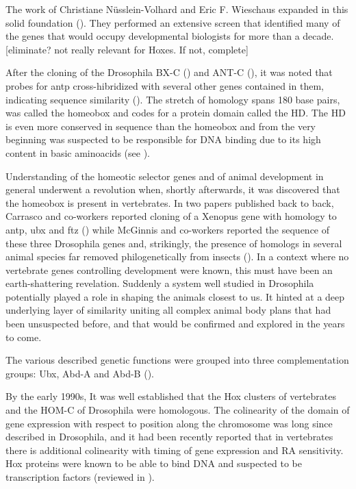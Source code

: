 The work of Christiane Nüsslein-Volhard and Eric F. Wieschaus expanded in this solid foundation (\cite{Nuesslein-Volhard1980}). They performed an extensive screen that identified many of the genes that would occupy developmental biologists for more than a decade. [eliminate? not really relevant for Hoxes. If not, complete]

After the cloning of the Drosophila \ac{BX-C} (\cite{Bender1983}) and \ac{ANT-C} (\cite{Garber1983,Scott1983}), it was noted that probes for \ac{antp} cross-hibridized with several other genes contained in them, indicating sequence similarity (\cite{McGinnis1984}).  The stretch of homology spans 180 base pairs, was called the homeobox and codes for a protein domain called the \ac{HD}. The \ac{HD} is even more conserved in sequence than the homeobox and from the very beginning was suspected to be responsible for DNA binding due to its high content in basic aminoacids (see \cite{Gehring1985}).

Understanding of the homeotic selector genes and of animal development in general underwent a revolution when, shortly afterwards, it was discovered that the homeobox is present in vertebrates. In two papers published back to back, Carrasco and co-workers reported cloning of a Xenopus gene with homology to \ac{antp}, \ac{ubx} and \ac{ftz} (\cite{Carrasco1984}) while McGinnis and co-workers reported the sequence of these three Drosophila genes and, strikingly, the presence of homologs in several animal species far removed philogenetically from insects (\cite{McGinnis1984b}). In a context where no vertebrate genes controlling development were known, this must have been an earth-shattering revelation. Suddenly a system well studied in Drosophila potentially played a role in shaping the animals closest to us. It hinted at a deep underlying layer of similarity uniting all complex animal body plans that had been unsuspected before, and that would be confirmed and explored in the years to come.

The various described genetic functions were grouped into three complementation groups: Ubx, Abd-A and Abd-B (\cite{Sanchez-Herrero1985}).%


By the early 1990s, It was well established that the Hox clusters of vertebrates and the \ac{HOM-C} of Drosophila were homologous. The colinearity of the domain of gene expression with respect to position along the chromosome was long since described in  Drosophila, and it had been recently reported that in vertebrates there is additional colinearity with timing of gene expression and RA sensitivity. Hox proteins were known to be able to bind DNA and suspected to be transcription factors (reviewed in \cite{Levine1988, McGinnis1992}). 


